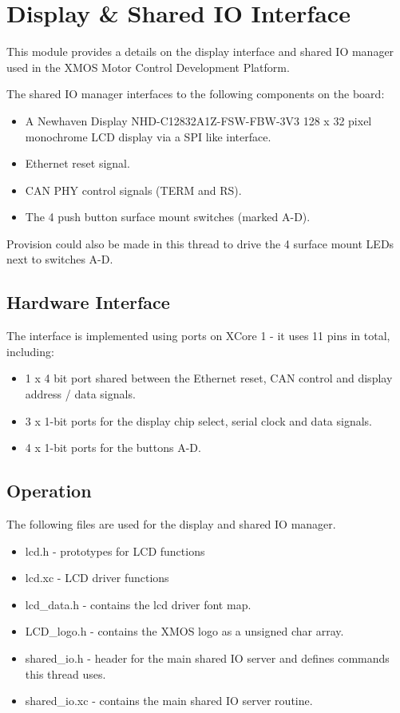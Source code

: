 \section{Display \& Shared IO Interface}
This module provides a details on the display interface and shared IO manager used in the XMOS Motor Control Development Platform.

The shared IO manager interfaces to the following components on the board:

\begin{itemize}
\item A Newhaven Display NHD-C12832A1Z-FSW-FBW-3V3 128 x 32 pixel monochrome LCD display via a SPI like interface.
\item Ethernet reset signal.
\item CAN PHY control signals (TERM and RS).
\item The 4 push button surface mount switches (marked A-D).
\end{itemize}

Provision could also be made in this thread to drive the 4 surface mount LEDs next to switches A-D.


\subsection{Hardware Interface}

The interface is implemented using ports on XCore 1 - it uses 11 pins in total, including:

\begin{itemize}
\item 1 x 4 bit port shared between the Ethernet reset, CAN control and display address / data signals.
\item 3 x 1-bit ports for the display chip select, serial clock and data signals.
\item 4 x 1-bit ports for the buttons A-D. 
\end{itemize}


\subsection{Operation}

The following files are used for the display and shared IO manager.

\begin{itemize}
\item lcd.h - prototypes for LCD functions
\item lcd.xc - LCD driver functions
\item lcd\_data.h - contains the lcd driver font map.
\item LCD\_logo.h - contains the XMOS logo as a unsigned char array.
\item shared\_io.h - header for the  main shared IO server and defines commands this thread uses.
\item shared\_io.xc - contains the main shared IO server routine. 
\end{itemize}

